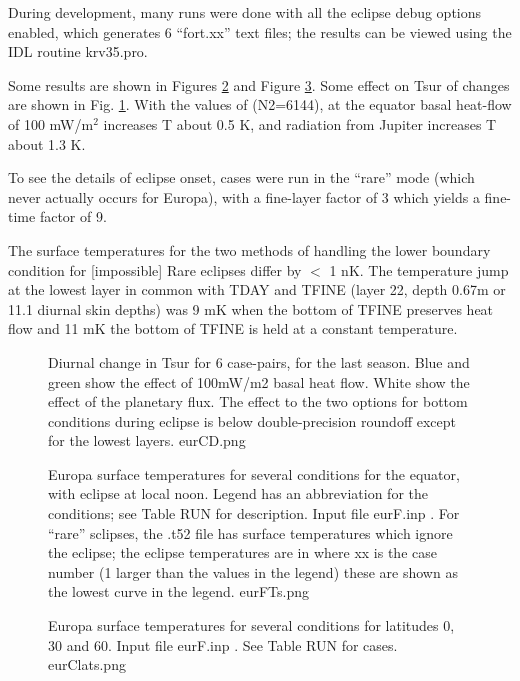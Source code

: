 \documentclass{article}
\begin{document}
During development, many runs were done with all the eclipse debug options
enabled, which generates 6 ``fort.xx'' text files; the results can be viewed using the
IDL routine krv35.pro.

Some results are shown in Figures \ref{eurFTs} and Figure \ref{eurClats}. Some
effect on Tsur of changes are shown in Fig. \ref{eurCD}.  With the values of
 (N2=6144), at the equator basal heat-flow of 100 mW/m$^2$ increases T about 0.5
K, and radiation from Jupiter increases T about 1.3 K. 

To see the details of eclipse onset, cases were run in the ``rare'' mode (which never actually occurs for Europa), with a fine-layer factor of 3 which  yields a fine-time factor of 9. 

The surface temperatures
for the two methods of handling the lower boundary condition for [impossible]
Rare eclipses differ by $<$ 1 nK. The temperature jump at the lowest layer in
common with TDAY and TFINE (layer 22, depth 0.67m or 11.1 diurnal skin depths)
was 9 mK when the bottom of TFINE preserves heat flow and 11 mK the bottom of
TFINE is held at a constant temperature. 

\begin{figure}[!ht] 
\caption[Effect of changes conditions]{Diurnal change in Tsur for 6 case-pairs,
  for the last season. Blue and green show the effect of 100mW/m2 basal heat
  flow.  White show the effect of the planetary flux. The effect
  to the two options for bottom conditions during eclipse is below
  double-precision roundoff except for the lowest layers.
\label{eurCD} eurCD.png  }
\end{figure} 

\begin{figure}[!ht] 
\caption[Europa surface T]{Europa surface temperatures for several conditions
  for the equator, with eclipse at local noon. Legend has an abbreviation for
  the conditions; see Table RUN for description.  Input file eurF.inp . For
  ``rare'' sclipses, the .t52 file has surface temperatures which ignore the
  eclipse; the eclipse temperatures are in  where xx is the
  case number (1 larger than the values in the legend) these are shown as the
  lowest curve in the legend.
\label{eurFTs} eurFTs.png }
\end{figure} 

\begin{figure}[!ht] 
\caption[Europa 3 latitudes]{Europa surface temperatures for several conditions for latitudes 0, 30 and 60. Input file eurF.inp . See Table RUN for cases. 
\label{eurClats}  eurClats.png }
\end{figure} 
\end{document}
